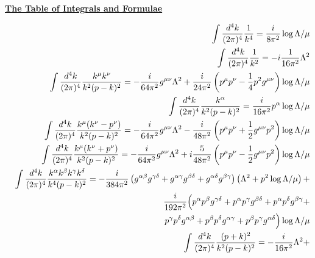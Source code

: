 \documentclass[14pt]{article}
\begin{document}
\begin{center}
	{\Large\bf\underline{The Table of Integrals and Formulae}}
\end{center}

\bigskip

\begin{eqnarray}
\nonumber
&&	\int \frac{d^4k}{(2\pi)^4} 
		\frac{1}{k^4} =
		\frac{i}{8 \pi^2} \log \Lambda/\mu   \\
\nonumber
&&	\int \frac{d^4k}{(2\pi)^4} 
		\frac{1}{k^2} =
		-i \frac{1}{16\pi^2}\Lambda^2		\\
\nonumber
&&	\int \frac{d^4k}{(2\pi)^4} 
		\frac{k^\mu k^\nu} 
		     {k^2 (p - k)^2} =
		-\frac{i}{64\pi^2}g^{\mu\nu}\Lambda^2 +
		\frac{i}{24\pi^2}
		\left(p^\mu p^\nu - \frac{1}{4}p^2 g^{\mu\nu}\right)
		\log \Lambda/\mu 			\\
\nonumber
&&	\int \frac{d^4k}{(2\pi)^4} 
		\frac{k^\alpha}
		     {k^2 (p - k)^2} =
		\frac{i}{16\pi^2}p^\alpha \log \Lambda/\mu 	\\
\nonumber
&&	\int \frac{d^4k}{(2\pi)^4} 
		\frac{k^\mu (k^\nu - p^\nu)}
		     {k^2 (p - k)^2} =
		-\frac{i}{64\pi^2}g^{\mu\nu}\Lambda^2 -
		\frac{i}{48\pi^2}\left(p^\mu p^\nu + 
				       \frac{1}{2}g^{\mu\nu}p^2\right)
					\log \Lambda/\mu	\\
\nonumber
&&	\int \frac{d^4k}{(2\pi)^4} 
		\frac{k^\mu (k^\nu + p^\nu)}
		     {k^2 (p - k)^2} =
		-\frac{i}{64\pi^2}g^{\mu\nu}\Lambda^2 +
		i\frac{5}{48\pi^2}\left(p^\mu p^\nu -
				       \frac{1}{2}g^{\mu\nu}p^2\right)
					\log \Lambda/\mu	\\
\nonumber
&&	\int \frac{d^4k}{(2\pi)^4} 
		\frac{k^\alpha k^\beta k^\gamma k^\delta}
		     {k^4 (p - k)^2} =
		- \frac{i}{384\pi^2}
		\left(g^{\alpha\beta}g^{\gamma\delta} +
		      g^{\alpha\gamma}g^{\beta\delta} +
                      g^{\alpha\delta}g^{\beta\gamma}\right)
		\left(\Lambda^2 + p^2 \log \Lambda/\mu\right) + \\
\nonumber
&&~~~~~~~~~~~~~~~~~~~~~~~~~~~~~~~~
		\frac{i}{192\pi^2}
		\Bigl(p^{\alpha}p^{\beta}g^{\gamma\delta} +
		      p^{\alpha}p^{\gamma}g^{\beta\delta} +
		      p^{\alpha}p^{\delta}g^{\beta\gamma} +     \\
\nonumber
&&~~~~~~~~~~~~~~~~~~~~~~~~~~~~~~~~~~~~~~~~~~
		      p^{\gamma}p^{\delta}g^{\alpha\beta} +
		      p^{\beta}p^{\delta}g^{\alpha\gamma} +
		      p^{\beta}p^{\gamma}g^{\alpha\delta}\Bigr)
		\log \Lambda/\mu \\
\nonumber
&&	\int \frac{d^4k}{(2\pi)^4} 
	     \frac{(p + k)^2}
		  {k^2 (p - k)^2} =
	    - \frac{i}{16\pi^2} \Lambda^2  +

\end{eqnarray}
\end{document}
